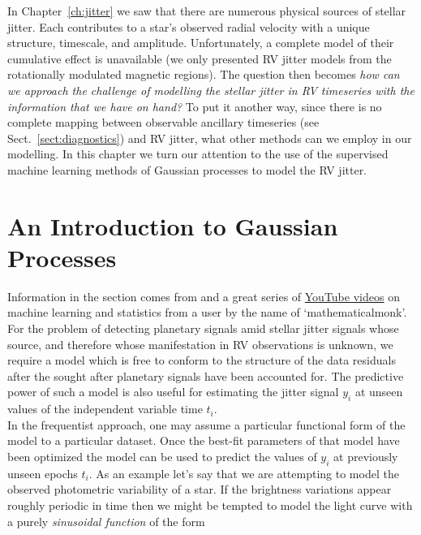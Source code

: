 In Chapter~\ref{ch:jitter} we saw that there are numerous physical sources of stellar 
jitter. Each contributes to a star's observed radial velocity with a unique structure, 
timescale, and amplitude. Unfortunately, a complete model of 
their cumulative effect is unavailable (we only presented RV jitter 
models from the rotationally modulated magnetic regions). 
The question then becomes \emph{how can we approach the challenge of 
modelling the stellar jitter in RV timeseries with the information that we have on hand?} 
To put it another way, since there is no complete mapping between observable ancillary 
timeseries (see Sect.~\ref{sect:diagnostics}) and RV jitter, what other methods can we 
employ in our modelling. In this chapter we turn our attention to the use of the 
supervised machine learning methods of Gaussian processes to model the RV jitter. \\

\section{An Introduction to Gaussian Processes} \label{sect:gpintro}
Information in the section comes from \cite{rasmussen06} and a great series of 
\href{https://www.youtube.com/playlist?list=PLD0F06AA0D2E8FFBA}{YouTube videos} 
on machine learning and statistics from a user by the name of `mathematicalmonk'. \\

For the problem of detecting planetary signals amid stellar jitter signals whose 
source, and therefore whose manifestation in RV observations is unknown, we require a model 
which is free to conform to the structure of the data residuals after the sought after 
planetary signals have been accounted for. The predictive power of such a model is 
also useful for estimating the jitter signal $y_i$ at unseen values of the independent 
variable time $t_i$. \\

In the frequentist approach, one may assume a particular functional form of the 
model to a particular 
dataset. Once the best-fit parameters of that model have been optimized 
the model can be used to predict the values of $y_i$ at previously unseen epochs $t_i$. 
As an example let's say that we are attempting to model the observed 
photometric variability of a star. If the brightness variations 
appear roughly periodic in time then we might be tempted 
to model the light curve with a purely \emph{sinusoidal function} of the form 

